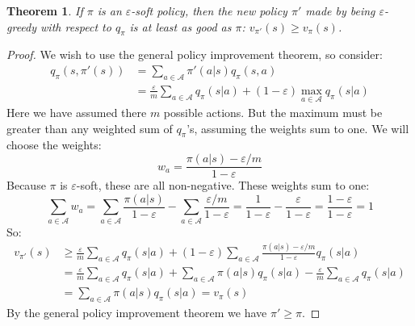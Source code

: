 \documentclass[12pt, a4paper]{article}
\newtheorem{theorem}{Theorem}[section]
\numberwithin{equation}{section}
\begin{document}
\begin{theorem}
If $\pi$ is an $\varepsilon$-soft policy, then the new policy $\pi'$ made by being $\varepsilon$-greedy with respect to $q_\pi$ is at least as good as $\pi$: $v_{\pi'}(s)\ge v_\pi(s)$.
\end{theorem}
\begin{proof}
We wish to use the general policy improvement theorem, so consider:
\begin{align}
q_\pi(s,\pi'(s))&=\sum_{a\in\mathcal{A}}\pi'(a|s)q_\pi(s,a)\\
&=\frac{\varepsilon}{m}\sum_{a\in\mathcal{A}}q_\pi(s|a)+(1-\varepsilon)\max_{a\in\mathcal{A}}q_\pi(s|a)
\end{align}
Here we have assumed there $m$ possible actions. But the maximum must be greater than any weighted sum of $q_\pi$'s, assuming the weights sum to one. We will choose the weights:
\begin{equation}
w_a=\frac{\pi(a|s)-\varepsilon/m}{1-\varepsilon}
\end{equation}
Because $\pi$ is $\varepsilon$-soft, these are all non-negative. These weights sum to one:
\begin{equation}
\sum_{a\in\mathcal{A}}w_a=\sum_{a\in\mathcal{A}}\frac{\pi(a|s)}{1-\varepsilon}-\sum_{a\in\mathcal{A}}\frac{\varepsilon/m}{1-\varepsilon}=\frac{1}{1-\varepsilon}-\frac{\varepsilon}{1-\varepsilon}=\frac{1-\varepsilon}{1-\varepsilon}=1
\end{equation}
So:
\begin{align}
v_{\pi'}(s)&\ge\frac{\varepsilon}{m}\sum_{a\in\mathcal{A}}q_\pi(s|a)+(1-\varepsilon)\sum_{a\in\mathcal{A}}\frac{\pi(a|s)-\varepsilon/m}{1-\varepsilon}q_\pi(s|a)\\
&=\frac{\varepsilon}{m}\sum_{a\in\mathcal{A}}q_\pi(s|a)+\sum_{a\in\mathcal{A}}\pi(a|s)q_\pi(s|a)-\frac{\varepsilon}{m}\sum_{a\in\mathcal{A}}q_\pi(s|a)\\
&=\sum_{a\in\mathcal{A}}\pi(a|s)q_\pi(s|a)=v_\pi(s)
\end{align}
By the general policy improvement theorem we have $\pi'\ge\pi$.
\end{proof}
\end{document}
